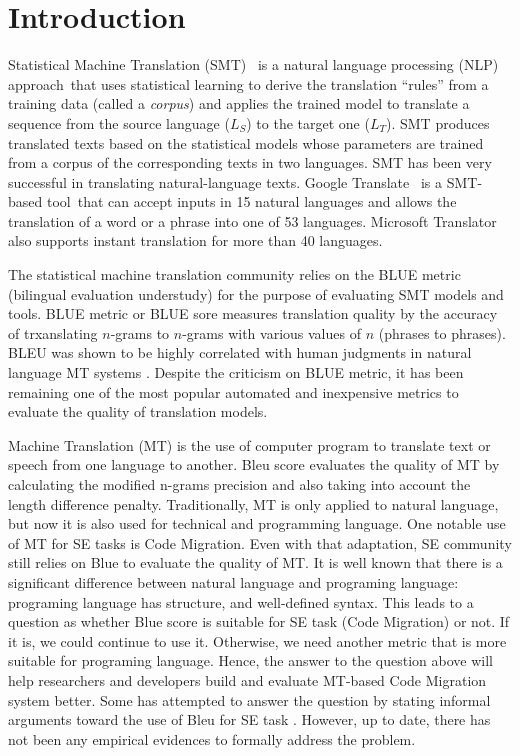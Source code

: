 \section{Introduction}
\label{sec:intro}

Statistical Machine Translation (SMT)~\cite{smtbook} is a natural
language processing (NLP) approach~that uses statistical learning to
derive the translation ``rules'' from a training data (called a {\em
  corpus}) and applies the trained model to translate a sequence from
the source language ($L_S$) to the target one ($L_T$). SMT produces
translated texts based on the statistical models whose parameters are
trained from a corpus of the corresponding texts in two languages. SMT
has been very successful in translating natural-language texts.
Google Translate~\cite{googletranslate} is a SMT-based tool~that can
accept inputs in 15 natural languages and allows the translation of a
word or a phrase into one of 53 languages.  Microsoft
Translator~\cite{mstranslator} also supports instant translation for
more than 40 languages.

The statistical machine translation community relies on the BLUE
metric (bilingual evaluation understudy) for the purpose of evaluating
SMT models and tools.
%
%
BLUE metric or BLUE sore measures translation quality by the accuracy
of trxanslating $n$-grams to $n$-grams with various values of $n$
(phrases to phrases). BLEU was shown to be highly correlated with
human judgments in natural language MT systems \cite {Papineni02}.
Despite the criticism on BLUE metric, it has been remaining one of the
most popular automated and inexpensive metrics to evaluate the quality
of translation models.





Machine Translation (MT) is the use of computer program to translate
text or speech from one language to another. Bleu score evaluates the
quality of MT by calculating the modified n-grams precision and also
taking into account the length difference penalty. Traditionally, MT
is only applied to natural language, but now it is also used for
technical and programming language. One notable use of MT for SE tasks
is Code Migration. Even with that adaptation, SE community still
relies on Blue to evaluate the quality of MT. It is well known that
there is a significant difference between natural language and
programing language: programing language has structure, and
well-defined syntax. This leads to a question as whether Blue score is
suitable for SE task (Code Migration) or not. If it is, we could
continue to use it. Otherwise, we need another metric that is more
suitable for programing language. Hence, the answer to the question
above will help researchers and developers build and evaluate MT-based
Code Migration system better. Some has attempted to answer the
question by stating informal arguments toward the use of Bleu for SE
task \cite{}. However, up to date, there has not been any empirical
evidences to formally address the problem.

